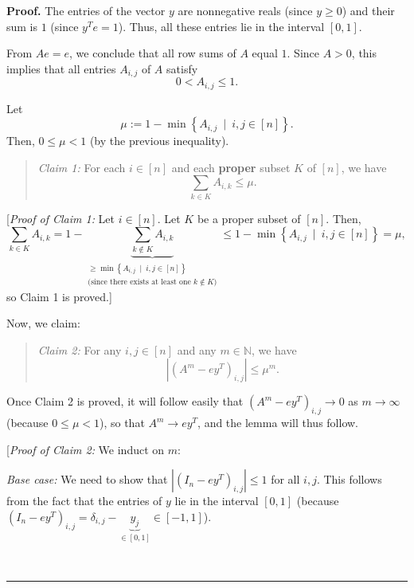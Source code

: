\documentclass[numbers=enddot,12pt,final,onecolumn,notitlepage]{scrartcl}%
\numberwithin{exer}{subsection}
\theoremstyle{definition}
\newenvironment{statement}{\begin{quote}}{\end{quote}}
\newenvironment{proof}[1][Proof]{\noindent\textbf{#1.} }{\ \rule{0.5em}{0.5em}}
\let\sumnonlimits\sum
\renewcommand{\sum}{\sumnonlimits\limits}
\begin{document}
\begin{proof}
The entries of the vector $y$ are nonnegative reals (since $y\geq0$) and their
sum is $1$ (since $y^{T}e=1$). Thus, all these entries lie in the interval
$\left[  0,1\right]  $.

From $Ae=e$, we conclude that all row sums of $A$ equal $1$. Since $A>0$, this
implies that all entries $A_{i,j}$ of $A$ satisfy%
\[
0<A_{i,j}\leq1.
\]


Let
\[
\mu:=1-\min\left\{  A_{i,j}\ \mid\ i,j\in\left[  n\right]  \right\}  .
\]
Then, $0\leq\mu<1$ (by the previous inequality).

\begin{statement}
\textit{Claim 1:} For each $i\in\left[  n\right]  $ and each \textbf{proper}
subset $K$ of $\left[  n\right]  $, we have%
\[
\sum_{k\in K}A_{i,k}\leq\mu.
\]

\end{statement}

[\textit{Proof of Claim 1:} Let $i\in\left[  n\right]  $. Let $K$ be a proper
subset of $\left[  n\right]  $. Then,
\[
\sum_{k\in K}A_{i,k}=1-\underbrace{\sum_{k\notin K}A_{i,k}}_{\substack{\geq
\min\left\{  A_{i,j}\ \mid\ i,j\in\left[  n\right]  \right\}  \\\text{(since
there exists at least one }k\notin K\text{)}}}\leq1-\min\left\{  A_{i,j}%
\ \mid\ i,j\in\left[  n\right]  \right\}  =\mu,
\]
so Claim 1 is proved.]

Now, we claim:

\begin{statement}
\textit{Claim 2:} For any $i,j\in\left[  n\right]  $ and any $m\in\mathbb{N}$,
we have%
\[
\left\vert \left(  A^{m}-ey^{T}\right)  _{i,j}\right\vert \leq\mu^{m}.
\]

\end{statement}

Once Claim 2 is proved, it will follow easily that $\left(  A^{m}%
-ey^{T}\right)  _{i,j}\rightarrow0$ as $m\rightarrow\infty$ (because $0\leq
\mu<1$), so that $A^{m}\rightarrow ey^{T}$, and the lemma will thus follow.

[\textit{Proof of Claim 2:} We induct on $m$:

\textit{Base case:} We need to show that $\left\vert \left(  I_{n}%
-ey^{T}\right)  _{i,j}\right\vert \leq1$ for all $i,j$. This follows from the
fact that the entries of $y$ lie in the interval $\left[  0,1\right]  $
(because $\left(  I_{n}-ey^{T}\right)  _{i,j}=\delta_{i,j}-\underbrace{y_{j}%
}_{\in\left[  0,1\right]  }\in\left[  -1,1\right]  $).


\end{proof}
\end{document}
